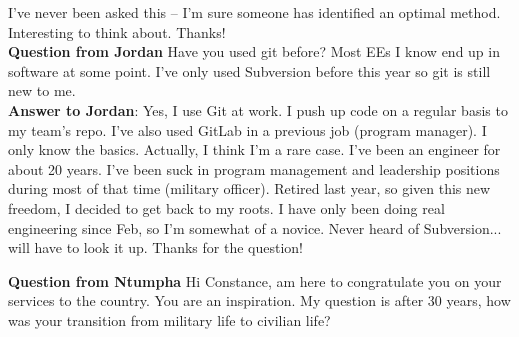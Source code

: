I've never been asked this  -- I'm sure someone has identified an optimal method.  Interesting to think about.  Thanks!   \\  

\textbf{Question from Jordan}
Have you used git before? Most EEs I know end up in software at some point. I've only used Subversion before this year so git is still new to me.  \\

\textbf{Answer to Jordan}:  Yes, I use Git at work.  I push up code on a regular basis to my team's repo.  I've also used GitLab in a previous job (program manager).  I only know the basics.  Actually, I think I'm a rare case.  I've been an engineer for about 20 years.  I've been suck in program management and leadership positions during most of that time (military officer).  Retired last year, so given this new freedom, I decided to get back to my roots.  I have only been doing real engineering since Feb, so I'm somewhat of a novice.  Never heard of Subversion... will have to look it up.  Thanks for the question!

\textbf{Question from Ntumpha}
Hi Constance, am here to congratulate you on your services to the country. You are an inspiration. My question is after 30 years, how was your transition from military life to civilian life?
